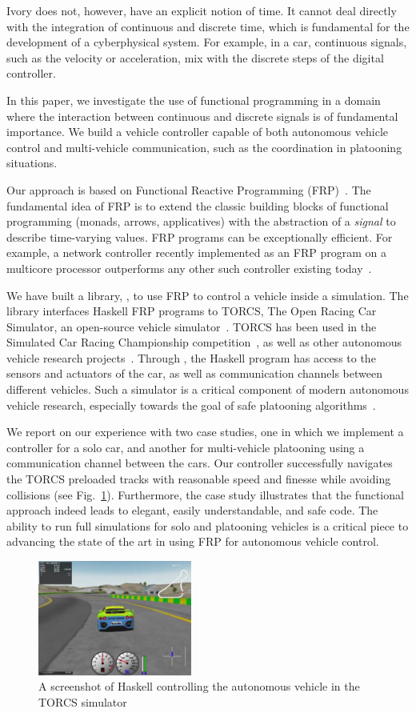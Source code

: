 Ivory does not, however, have an explicit notion of time.
It cannot deal directly with the integration of 
continuous and discrete time, which is fundamental for the
development of a cyberphysical system. For example,
in a car, continuous signals, such as the velocity or acceleration,
mix with the discrete steps of the digital controller.

In this paper, we investigate the use of functional programming
in a domain where the interaction between continuous and discrete signals
is of fundamental importance. We build a vehicle controller capable
of both autonomous vehicle control and multi-vehicle communication,
such as the coordination in platooning situations.

Our approach is based on Functional Reactive Programming
(FRP)~\cite{hudak2003arrows,hudak2000haskell}.
The fundamental idea of FRP is to extend the classic building blocks 
of functional programming (\eg monads, arrows,
applicatives)
with the abstraction of a \emph{signal} to
describe time-varying values. FRP programs can be exceptionally
efficient.  For example, a network controller recently implemented as
an FRP program on a multicore processor outperforms any other such
controller existing today~\cite{Voellmy:2012:SSD:2377677.2377735}.

We have built a library, \ourLib, to use FRP to control a vehicle inside a simulation.
The library interfaces Haskell FRP programs to TORCS, The Open Racing Car Simulator, an open-source vehicle simulator~\cite{torcs}.
TORCS has been used in the Simulated Car Racing Championship competition~\cite{SCRC}, as well as other autonomous vehicle research projects~\cite{xu2016experimental,OnievaPAMP09,conf/cig/CardamoneLL09,conf/cig/MunozGS10}. 
Through \ourLib, the Haskell program has access to the sensors and actuators of the car, as well
as communication channels between different vehicles.
Such a simulator is a  critical component of modern autonomous vehicle research, especially towards the goal of safe platooning algorithms~\cite{kamali2016formal}.

We report on our experience with two case studies, one in which we implement a controller for a solo car, and another for multi-vehicle platooning using a communication channel between the cars.
Our controller successfully navigates the TORCS preloaded tracks with reasonable speed and finesse while avoiding collisions (see Fig.~\ref{fig:race}).
Furthermore, the case study illustrates that the functional approach indeed leads to elegant, easily understandable, and safe code.
The ability to run full simulations for solo and platooning vehicles is a critical piece to advancing the state of the art in using FRP for autonomous vehicle control.

\begin{figure}[t]
\includegraphics[width=0.45\textwidth]{figs/racing.png}
\caption{A screenshot of Haskell controlling the autonomous vehicle in the TORCS simulator}
\label{fig:race}
\end{figure}
